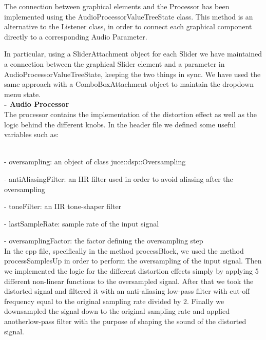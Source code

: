 \documentclass[letterpaper, 12pt]{article}
\begin{document}
	The connection between graphical elements and the Processor has been implemented using the AudioProcessorValueTreeState class. This method is an alternative to the Listener class, in order to connect each graphical component directly to a corresponding Audio Parameter.
	
	In particular, using  a SliderAttachment object for each Slider we have maintained a connection between the graphical Slider element and a parameter in AudioProcessorValueTreeState, keeping the two things in sync. We have used the same approach with a ComboBoxAttachment object to maintain the dropdown menu state.
	\\
	
	\textbf{-	Audio Processor 
}\\

        The processor contains the implementation of the distortion effect as well as the logic behind the different knobs.
        In the header file we defined some useful variables such as:
        
        \\
	-	oversampling: an object of class juce::dsp::Oversampling
	
	-	antiAliasingFilter: an IIR filter used in order to avoid aliasing after the oversampling
	
	-	toneFilter: an IIR tone-shaper filter
	
	-	lastSampleRate: sample rate of the input signal

	-	oversamplingFactor: the factor defining the oversampling step
        \\

        In the cpp file, specifically in the method processBlock, we used the method processSamplesUp in order to perform the oversampling of the input signal.
        Then we implemented the logic for the different distortion effects simply by applying 5 different non-linear functions to the oversampled signal.
        After that we took the distorted signal and filtered it with an anti-aliasing low-pass filter with cut-off frequency equal to the original sampling rate divided by 2.
        Finally we downsampled the signal down to the original sampling rate and applied anotherlow-pass filter with the purpose of shaping the sound of the distorted signal.  
	
	\begin{thebibliography}{99}
		
	\end{thebibliography}
	
	
\end{document}
